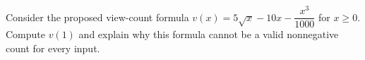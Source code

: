 Consider the proposed view-count formula $v(x)=5\sqrt{x}-10x-\dfrac{x^3}{1000}$ for $x\ge0$. Compute $v(1)$ and explain why this formula cannot be a valid nonnegative count for every input.
